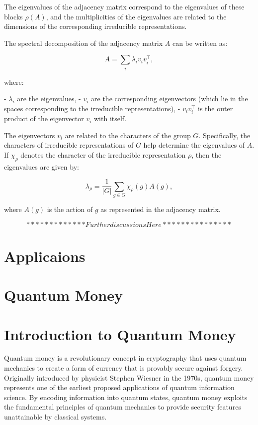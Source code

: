 \documentclass[11pt]{article}
\theoremstyle{definition}
\begin{document}
The eigenvalues of the adjacency matrix correspond to the eigenvalues of these blocks $\rho(A)$, and the multiplicities of the eigenvalues are related to the dimensions of the corresponding irreducible representations.

The spectral decomposition of the adjacency matrix $A$ can be written as:

\[
A = \sum_{i} \lambda_{i} v_{i} v_{i}^{\top},
\]

where:

- $\lambda_{i}$ are the eigenvalues,
- $v_{i}$ are the corresponding eigenvectors (which lie in the spaces corresponding to the irreducible representations),
- $v_{i} v_{i}^{\top}$ is the outer product of the eigenvector $v_{i}$ with itself.

The eigenvectors $v_{i}$ are related to the characters of the group $G$. Specifically, the characters of irreducible representations of $G$ help determine the eigenvalues of $A$. If $\chi_{\rho}$ denotes the character of the irreducible representation $\rho$, then the eigenvalues are given by:

\[
\lambda_{\rho} = \frac{1}{|G|} \sum_{g \in G} \chi_{\rho}(g) A(g),
\]

where $A(g)$ is the action of $g$ as represented in the adjacency matrix.


\[
*************Further discussions Here***************
\]


\section{Applicaions}
\section{Quantum Money}


\section*{Introduction to Quantum Money}
Quantum money is a revolutionary concept in cryptography that uses quantum mechanics to create a form of currency that is provably secure against forgery. Originally introduced by physicist Stephen Wiesner in the 1970s, quantum money represents one of the earliest proposed applications of quantum information science. By encoding information into quantum states, quantum money exploits the fundamental principles of quantum mechanics to provide security features unattainable by classical systems.
\end{document}
